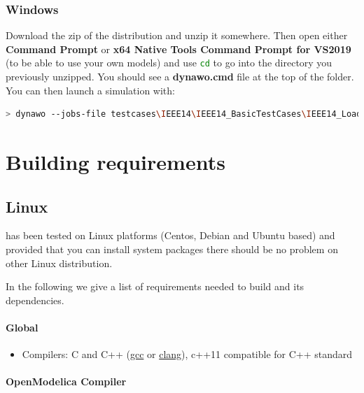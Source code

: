 \documentclass[a4paper, 12pt]{report}
\begin{document}
\subsubsection{Windows}

Download the zip of the distribution and unzip it somewhere. Then open either \textbf{Command Prompt} or \textbf{x64 Native Tools Command Prompt for VS2019} (to be able to use your own models) and use \lstinline[language=bash]{cd} to go into the directory you previously unzipped. You should see a \textbf{dynawo.cmd} file at the top of the folder. You can then launch a simulation with:

\begin{lstlisting}[language=bash, breaklines=true, breakatwhitespace=false]
> dynawo --jobs-file testcases\IEEE14\IEEE14_BasicTestCases\IEEE14_LoadVariation\IEEE14.jobs
\end{lstlisting}

\section{Building requirements}

\subsection{Linux}

\Dynawo has been tested on Linux platforms (Centos, Debian and Ubuntu based) and provided that you can install system packages there should be no problem on other Linux distribution.

In the following we give a list of requirements needed to build \Dynawo and its dependencies.

\paragraph{Global}

\begin{itemize}
\item Compilers: C and C++ (\href{https://www.gnu.org/software/gcc}{gcc} or \href{https://clang.llvm.org}{clang}), c++11 compatible for C++ standard
\end{itemize}

\paragraph{OpenModelica Compiler}
\end{document}
